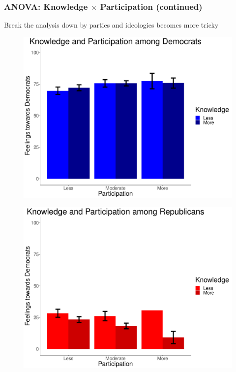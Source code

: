\documentclass[14pt]{beamer}
\begin{document}
\begin{frame}
\frametitle{ANOVA: Knowledge $\times$ Participation (continued)}
Break the analysis down by parties and ideologies becomes more tricky
\end{frame}

\begin{frame}
\begin{center}
	\begin{figure}[ht!]  
		{	 \includegraphics[width=.9\textwidth]{KPDemADem}}
	\end{figure}
\end{center}
\end{frame}

\begin{frame}
\begin{center}
	\begin{figure}[ht!]  
		{	 \includegraphics[width=.9\textwidth]{KPDemARep}}
	\end{figure}
\end{center}
\end{frame}
\end{document}

